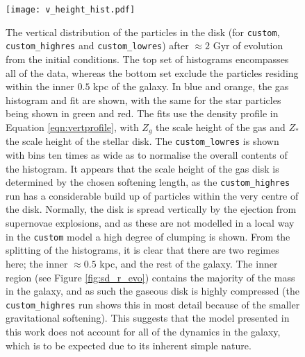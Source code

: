 \begin{figure}
    \centering
    \texttt{[image: v\_height\_hist.pdf]}
    \caption{The vertical distribution of the particles in the disk (for {\tt custom}, {\tt custom\_highres} and {\tt custom\_lowres}) after $\approx 2$ Gyr of evolution from the initial conditions. The top set of histograms encompasses all of the data, whereas the bottom set exclude the particles residing within the inner $0.5$ kpc of the galaxy. In blue and orange, the gas histogram and fit are shown, with the same for the star particles being shown in green and red. The fits use the density profile in Equation \ref{eqn:vertprofile}, with $Z_g$ the scale height of the gas and $Z_*$ the scale height of the stellar disk. The {\tt custom\_lowres} is shown with bins ten times as wide as to normalise the overall contents of the histogram. It appears that the scale height of the gas disk is determined by the chosen softening length, as the {\tt custom\_highres} run has a considerable build up of particles within the very centre of the disk. Normally, the disk is spread vertically by the ejection from supernovae explosions, and as these are not modelled in a local way in the {\tt custom} model a high degree of clumping is shown. From the splitting of the histograms, it is clear that there are two regimes here; the inner $\approx 0.5$ kpc, and the rest of the galaxy. The inner region (see Figure \ref{fig:sd_r_evo}) contains the majority of the mass in the galaxy, and as such the gaseous disk is highly compressed (the {\tt custom\_highres} run shows this in most detail because of the smaller gravitational softening). This suggests that the model presented in this work does not account for all of the dynamics in the galaxy, which is to be expected due to its inherent simple nature.}
    \label{fig:vheighthist}
\end{figure}
